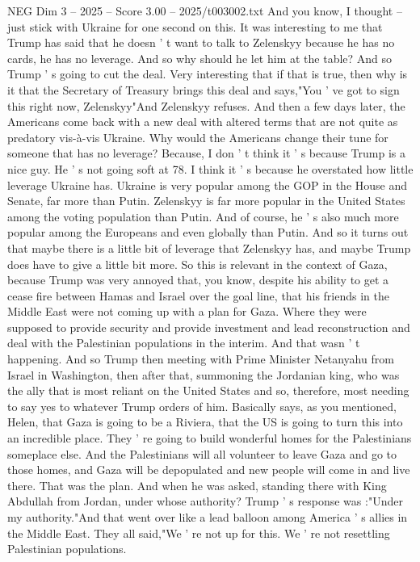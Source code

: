 \begin{textsample}{NEG Dim 3 – 2025 – Score 3.00 – 2025/t003002.txt}
And you know, I thought -- just stick with Ukraine for one second on this.
It was interesting to me that Trump has said that he doesn ' t want to talk to Zelenskyy because he has no cards, he has no leverage.
And so why should he let him at the table?
And so Trump ' s going to cut the deal.
Very interesting that if that is true, then why is it that the Secretary of Treasury brings this deal and says,"You ' ve got to sign this right now, Zelenskyy"And Zelenskyy refuses.
And then a few days later, the Americans come back with a new deal with altered terms that are not quite as predatory vis-à-vis Ukraine.
Why would the Americans change their tune for someone that has no leverage?
Because, I don ' t think it ' s because Trump is a nice guy.
He ' s not going soft at 78.
I think it ' s because he overstated how little leverage Ukraine has.
Ukraine is very popular among the GOP in the House and Senate, far more than Putin.
Zelenskyy is far more popular in the United States among the voting population than Putin.
And of course, he ' s also much more popular among the Europeans and even globally than Putin.
And so it turns out that maybe there is a little bit of leverage that Zelenskyy has, and maybe Trump does have to give a little bit more.
So this is relevant in the context of Gaza, because Trump was very annoyed that, you know, despite his ability to get a cease fire between Hamas and Israel over the goal line, that his friends in the Middle East were not coming up with a plan for Gaza.
Where they were supposed to provide security and provide investment and lead reconstruction and deal with the Palestinian populations in the interim.
And that wasn ' t happening.
And so Trump then meeting with Prime Minister Netanyahu from Israel in Washington, then after that, summoning the Jordanian king, who was the ally that is most reliant on the United States and so, therefore, most needing to say yes to whatever Trump orders of him.
Basically says, as you mentioned, Helen, that Gaza is going to be a Riviera, that the US is going to turn this into an incredible place.
They ' re going to build wonderful homes for the Palestinians someplace else.
And the Palestinians will all volunteer to leave Gaza and go to those homes, and Gaza will be depopulated and new people will come in and live there.
That was the plan.
And when he was asked, standing there with King Abdullah from Jordan, under whose authority?
Trump ' s response was :"Under my authority."And that went over like a lead balloon among America ' s allies in the Middle East.
They all said,"We ' re not up for this.
We ' re not resettling Palestinian populations.

\end{textsample}
